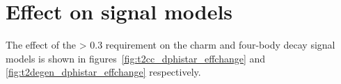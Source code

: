 




\section{Effect on signal models}
The effect of the \mindphistar > 0.3 requirement on the charm and
four-body decay signal models is shown in figures~\ref{fig:t2cc_dphistar_effchange}
and \ref{fig:t2degen_dphistar_effchange} respectively.

